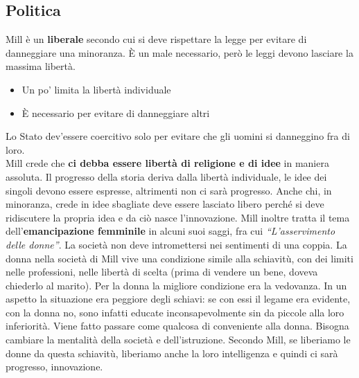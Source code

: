 \subsection{Politica}
Mill è un \textbf{liberale} secondo cui si deve rispettare la legge per evitare di danneggiare una
minoranza. È un male necessario, però le leggi devono lasciare la massima libertà.
\begin{itemize}
  \item Un po' limita la libertà individuale
  \item È necessario per evitare di danneggiare altri
\end{itemize}
Lo Stato dev'essere coercitivo solo per evitare che gli uomini si danneggino fra di loro.\\
Mill crede che \textbf{ci debba essere libertà di religione e di idee} in maniera assoluta. Il 
progresso della storia deriva dalla libertà individuale, le idee dei singoli devono essere espresse,
altrimenti non ci sarà progresso. Anche chi, in minoranza, crede in idee sbagliate deve essere
lasciato libero perché si deve ridiscutere la propria idea e da ciò nasce l'innovazione. Mill
inoltre tratta il tema dell'\textbf{emancipazione femminile} in alcuni suoi saggi, fra cui 
\textit{``L'asservimento delle donne''}. La società non deve intromettersi nei sentimenti di una
coppia. La donna nella società di Mill vive una condizione simile alla schiavitù, con dei limiti 
nelle professioni, nelle libertà di scelta (prima di vendere un bene, doveva chiederlo al marito). 
Per la donna la migliore condizione era la vedovanza. In un aspetto la situazione era peggiore degli
schiavi: se con essi il legame era evidente, con la donna no, sono infatti educate inconsapevolmente
sin da piccole alla loro inferiorità. Viene fatto passare come qualcosa di conveniente alla donna.
Bisogna cambiare la mentalità della società e dell'istruzione. Secondo Mill, se liberiamo le
donne da questa schiavitù, liberiamo anche la loro intelligenza e quindi ci sarà progresso, 
innovazione.

